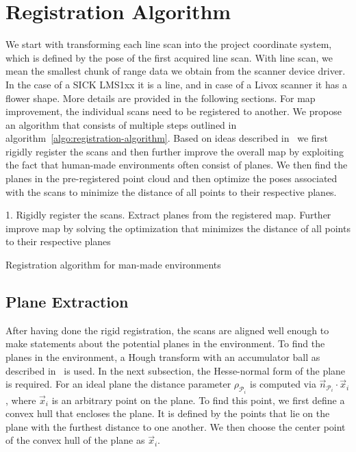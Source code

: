 \section{Registration Algorithm}

We start with transforming each line scan into the project coordinate system, which is defined by the pose of the first acquired line scan.
With line scan, we mean the smallest chunk of range data we obtain from the scanner device driver.
In the case of a SICK LMS1xx it is a line, and in case of a Livox scanner it has a flower shape.
More details are provided in the following sections.
%
For map improvement, the individual scans need to be registered to another. 
We propose an algorithm that consists of multiple steps outlined in algorithm~\ref{algo:registration-algorithm}. 
Based on ideas described in~\cite{Borrmann2010} we first rigidly register the scans and then further improve the overall map by exploiting the fact that human-made environments often consist of planes. 
We then find the planes in the pre-registered point cloud and then optimize the poses associated with the scans to minimize the distance of all points to their respective planes. 

\begin{algorithm}
    \SetAlgoLined
    1. Rigidly register the scans. Extract planes from the registered map. Further improve map by solving the optimization that minimizes the distance of all points to their respective planes\;
    \caption{Registration algorithm for man-made environments}
    \label{algo:registration-algorithm}
\end{algorithm}

\subsection{Plane Extraction}

After having done the rigid registration, the scans are aligned well enough to make statements about the potential planes in the environment.
To find the planes in the environment, a Hough transform with an accumulator ball as described in~\cite{Borrmann2011The3H} is used. 
In the next subsection, the Hesse-normal form of the plane is required.
For an ideal plane the distance parameter $\rho_{\mathcal{P}_i}$ is computed via $\vec{n}_{\mathcal{P}_i}\cdot\vec{x}_i$, where $\vec{x}_i$ is an arbitrary point on the plane.
To find this point, we first define a convex hull that encloses the plane.
It is defined by the points that lie on the plane with the furthest distance to one another.
We then choose the center point of the convex hull of the plane as $\vec{x}_i$.


